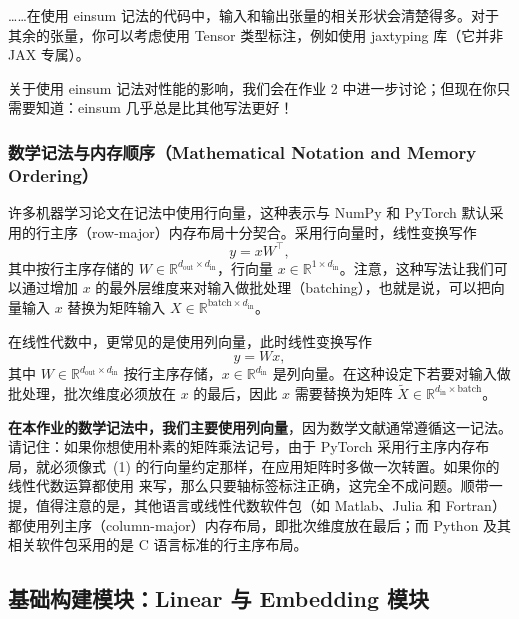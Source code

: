 
……在使用 einsum 记法的代码中，输入和输出张量的相关形状会清楚得多。对于其余的张量，你可以考虑使用 Tensor 类型标注，例如使用 jaxtyping 库（它并非 JAX 专属）。

关于使用 einsum 记法对性能的影响，我们会在作业 2 中进一步讨论；但现在你只需要知道：einsum 几乎总是比其他写法更好！

\subsubsection{数学记法与内存顺序（Mathematical Notation and Memory Ordering）}

许多机器学习论文在记法中使用行向量，这种表示与 NumPy 和 PyTorch 默认采用的行主序（row-major）内存布局十分契合。采用行向量时，线性变换写作
\begin{equation}
y = xW^{\top},
\tag{1}
\end{equation}
其中按行主序存储的 $W \in \mathbb{R}^{d_{\mathrm{out}} \times d_{\mathrm{in}}}$，行向量 $x \in \mathbb{R}^{1 \times d_{\mathrm{in}}}$。注意，这种写法让我们可以通过增加 $x$ 的最外层维度来对输入做批处理（batching），也就是说，可以把向量输入 $x$ 替换为矩阵输入 $X \in \mathbb{R}^{\mathrm{batch} \times d_{\mathrm{in}}}$。

在线性代数中，更常见的是使用列向量，此时线性变换写作
\begin{equation}
y = Wx,
\tag{2}
\end{equation}
其中 $W \in \mathbb{R}^{d_{\mathrm{out}} \times d_{\mathrm{in}}}$ 按行主序存储，$x \in \mathbb{R}^{d_{\mathrm{in}}}$ 是列向量。在这种设定下若要对输入做批处理，批次维度必须放在 $x$ 的最后，因此 $x$ 需要替换为矩阵 $\tilde{X} \in \mathbb{R}^{d_{\mathrm{in}} \times \mathrm{batch}}$。

\textbf{在本作业的数学记法中，我们主要使用列向量}，因为数学文献通常遵循这一记法。请记住：如果你想使用朴素的矩阵乘法记号，由于 PyTorch 采用行主序内存布局，就必须像式~(1) 的行向量约定那样，在应用矩阵时多做一次转置。如果你的线性代数运算都使用  来写，那么只要轴标签标注正确，这完全不成问题。顺带一提，值得注意的是，其他语言或线性代数软件包（如 Matlab、Julia 和 Fortran）都使用列主序（column-major）内存布局，即批次维度放在最后；而 Python 及其相关软件包采用的是 C 语言标准的行主序布局。

\subsection{基础构建模块：Linear 与 Embedding 模块}

